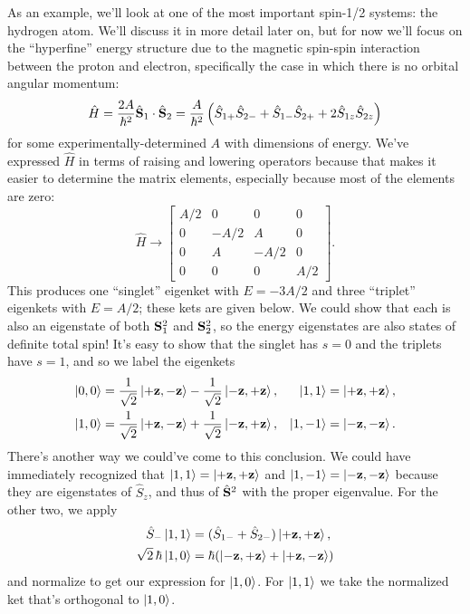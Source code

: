 \documentclass[../p116main.tex]{subfiles}
\begin{document}
As an example, we'll look at one of the most important spin-1/2 systems: the hydrogen atom.
We'll discuss it in more detail later on, but for now we'll focus on the ``hyperfine'' energy structure due to the magnetic spin-spin interaction between the proton and electron, specifically the case in which there is no orbital angular momentum:
\[ \hat H = \frac{2A}{\hbar^2} \hat{\mathbf{S}}_1 \cdot \hat{\mathbf{S}}_2 = \frac{A}{\hbar^2} \left( \hat S_{1+} \hat S_{2-} + \hat S_{1-} \hat S_{2+} + 2\hat S_{1z} \hat S_{2z} \right) \]
for some experimentally-determined $A$ with dimensions of energy.
We've expressed $\hat H$ in terms of raising and lowering operators because that makes it easier to determine the matrix elements, especially because most of the elements are zero:
\[ \hat H \longrightarrow \begin{bmatrix} A / 2 & 0 & 0 & 0 \\ 0 & -A / 2 & A & 0 \\ 0 & A & -A / 2 & 0 \\ 0 & 0 & 0 & A / 2 \end{bmatrix}. \]
This produces one ``singlet'' eigenket with $E = -3A / 2$ and three ``triplet'' eigenkets with $E = A / 2$; these kets are given below.
We could show that each is also an eigenstate of both $\mathbf{S}_1^2$ and $\mathbf{S}_2^2$, so the energy eigenstates are also states of definite total spin!
It's easy to show that the singlet has $s=0$ and the triplets have $s=1$, and so we label the eigenkets     \vspace{-6pt}
\begin{align*}
    \left| 0,0 \right> &= \frac{1}{\sqrt{2}} \left| +\mathbf{z}, -\mathbf{z} \right> - \frac{1}{\sqrt{2}} \left| -\mathbf{z}, +\mathbf{z} \right>, & \left| 1,1 \right> &= \left| +\mathbf{z}, +\mathbf{z} \right>, \\
    \left| 1,0 \right> &= \frac{1}{\sqrt{2}} \left| +\mathbf{z}, -\mathbf{z} \right> + \frac{1}{\sqrt{2}} \left| -\mathbf{z}, +\mathbf{z} \right>, & \left| 1,-1 \right> &= \left| -\mathbf{z}, -\mathbf{z} \right>.
\end{align*}
There's another way we could've come to this conclusion.
We could have immediately recognized that $\left| 1,1 \right> = \left| +\mathbf{z}, +\mathbf{z} \right>$ and $\left| 1,-1 \right> = \left| -\mathbf{z}, -\mathbf{z} \right>$ because they are eigenstates of $\hat S_z$, and thus of $\hat{\mathbf{S}}^2$ with the proper eigenvalue.
For the other two, we apply
\begin{align*}
    \hat S_- \left| 1,1 \right> &= (\hat S_{1-} + \hat S_{2-}) \left| +\mathbf{z}, +\mathbf{z} \right>, \\
    \sqrt{2} \,\hbar \left| 1,0 \right> &= \hbar (\left| -\mathbf{z}, +\mathbf{z} \right> + \left| +\mathbf{z}, -\mathbf{z} \right>)
\end{align*}
and normalize to get our expression for $\left| 1,0 \right>$.
For $\left| 1,1 \right>$ we take the normalized ket that's orthogonal to $\left| 1,0 \right>$.
\end{document}
